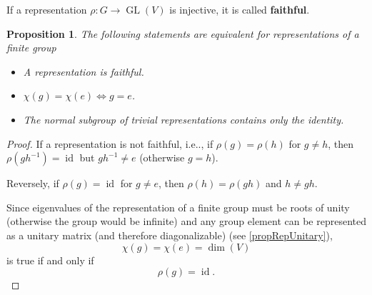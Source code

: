 \documentclass[12pt, letterpaper]{article}
\makeatletter
\newcommand{\GL}{\operatorname{GL}}
\newcommand{\idt}{\operatorname{id}}
\newcommand\ie{i.e\@ifnextchar.{}{.\@}}
\newtheorem{prop}{Proposition}[section]
\theoremstyle{definition}
\theoremstyle{remark}
\theoremstyle{definition}
\theoremstyle{plain}
\numberwithin{equation}{section}
\makeatother
\begin{document}
	\begin{def*}
		If a representation $\rho\colon G\to \GL(V)$ is injective, it is called \textbf{faithful}.
	\end{def*}
	\begin{prop}\label{propFaithful}
		The following statements are equivalent for representations of a finite group
		\begin{itemize}
			\item A representation is faithful.
			\item $\chi(g)=\chi(e)\iff g=e$.
			\item The normal subgroup of trivial representations contains only the identity.
		\end{itemize}
	\end{prop}
	\begin{proof}
		If a representation is not faithful, \ie, if $\rho(g)=\rho(h)$ for $g\ne h$,
		then $\rho(gh^{-1})=\idt$ but $gh^{-1}\ne e$ (otherwise $g=h$).
		
		Reversely, if $\rho(g)=\idt$ for $g\ne e$, then $\rho(h)=\rho(gh)$ and $h\ne gh$.
		
		Since eigenvalues of the representation of a finite group must be roots of unity (otherwise the group would be infinite)
		and any group element can be represented as a unitary matrix (and therefore diagonalizable) (see \autoref{propRepUnitary}),
		\[\chi(g)=\chi(e)=\dim(V) \] is true if and only if \[\rho(g)=\idt.\]
	\end{proof}
\end{document}
